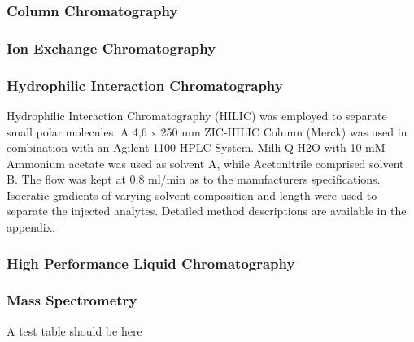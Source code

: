 \subsubsection{Column Chromatography} %
\label{sub:column_chromatography}

\subsubsection{Ion Exchange Chromatography} %
\label{sub:ion_exchange_chromatography}

\subsubsection{Hydrophilic Interaction Chromatography} %
\label{ssub:hilic}

Hydrophilic Interaction Chromatography (HILIC) was employed to separate small polar molecules. A   4,6 x 250 mm ZIC-HILIC Column (Merck) was used in combination with an Agilent 1100 HPLC-System.
Milli-Q H2O with 10 mM Ammonium acetate was used as solvent A, while Acetonitrile comprised solvent B. The flow was kept at 0.8 ml/min as to the manufacturers specifications. Isocratic gradients of varying solvent composition and length were used to separate the injected analytes. Detailed method descriptions are available in the appendix.
\subsubsection{High Performance Liquid Chromatography} %
\label{sub:hplc}


\subsubsection{Mass Spectrometry} %
\label{sub:mass_spectrometry}

A test table should be here

